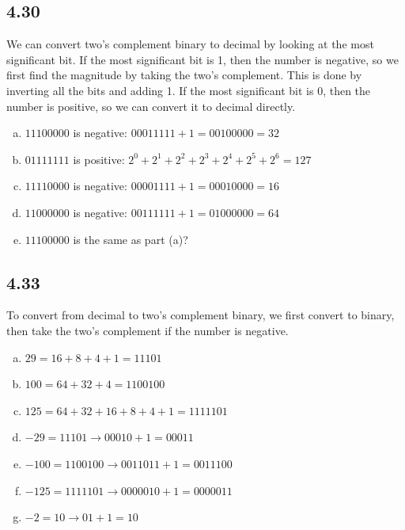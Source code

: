 \documentclass{article}
\begin{document}
\subsection*{4.30}
We can convert two's complement binary to decimal by looking at the most significant bit.
If the most significant bit is 1, then the number is negative, so we first find the magnitude by taking the two's complement.
This is done by inverting all the bits and adding 1.
If the most significant bit is 0, then the number is positive, so we can convert it to decimal directly.
\begin{enumerate}[(a)]
    \item $11100000$ is negative: $00011111 + 1 = 00100000 = 32$
    \item $01111111$ is positive: $2^0 + 2^1 + 2^2 + 2^3 + 2^4 + 2^5 + 2^6 = 127$
    \item $11110000$ is negative: $00001111 + 1 = 00010000 = 16$
    \item $11000000$ is negative: $00111111 + 1 = 01000000 = 64$
    \item $11100000$ is the same as part (a)?
\end{enumerate}

\subsection*{4.33}
To convert from decimal to two's complement binary, we first convert to binary, then take the two's complement if the number is negative.
\begin{enumerate}[(a)]
    \item $29 = 16 + 8 + 4 + 1 = 11101$
    \item $100 = 64 + 32 + 4 = 1100100$
    \item $125 = 64 + 32 + 16 + 8 + 4 + 1 = 1111101$
    \item $-29 = 11101 \rightarrow 00010 + 1 = 00011$
    \item $-100 = 1100100 \rightarrow 0011011 + 1 = 0011100$
    \item $-125 = 1111101 \rightarrow 0000010 + 1 = 0000011$
    \item $-2 = 10 \rightarrow 01 + 1 = 10$
\end{enumerate}
\end{document}
